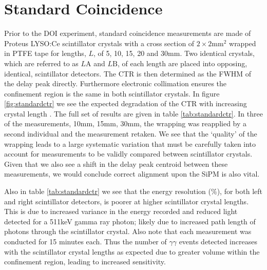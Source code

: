 \section{Standard Coincidence}
\label{sec:standardctr}
Prior to the DOI experiment, standard coincidence measurements are made of Proteus LYSO:Ce scintillator crystals with a cross section of $2\times2$mm$^2$ wrapped in PTFE tape for lengths, $L$, of 5, 10, 15, 20 and 30mm. Two identical crystals, which are referred to as $L\text{A}$ and $L\text{B}$, of each length are placed into opposing, identical, scintillator detectors. The CTR is then determined as the FWHM of the delay peak directly. Furthermore electronic collimation ensures the confinement region is the same in both scintillator crystals. In figure \ref{fig:standardctr} we see the expected degradation of the CTR with increasing crystal length \cite{r_Paganoni_Pauwels_et_al__2011}\cite{Wiener_Kaul_Surti_Karp_2010}\cite{Choong_2009}\cite{Gola_Piemonte_Tarolli_2013}\cite{o_Pro_Serra_Tarolli_Zorzi_2011}. The full set of results are given in table \ref{tab:standardctr}. In three of the measurements, 10mm, 15mm, 30mm, the wrapping was reapplied by a second individual and the measurement retaken. We see that the `quality' of the wrapping leads to a large systematic variation that must be carefully taken into account for measurements to be validly compared between scintillator crystals. Given that we also see a shift in the delay peak centroid between these measurements, we would conclude correct alignment upon the SiPM is also vital. 

Also in table \ref{tab:standardctr} we see that the energy resolution (\%), for both left and right scintillator detectors, is poorer at higher scintillator crystal lengths. This is due to increased variance in the energy recorded and reduced light detected for a 511keV gamma ray photon; likely due to increased path length of photons through the scintillator crystal. Also note that each measurement was conducted for 15 minutes each. Thus the number of $\gamma\gamma$ events detected increases with the scintillator crystal lengths as expected  due to greater volume within the confinement region, leading to increased sensitivity.
